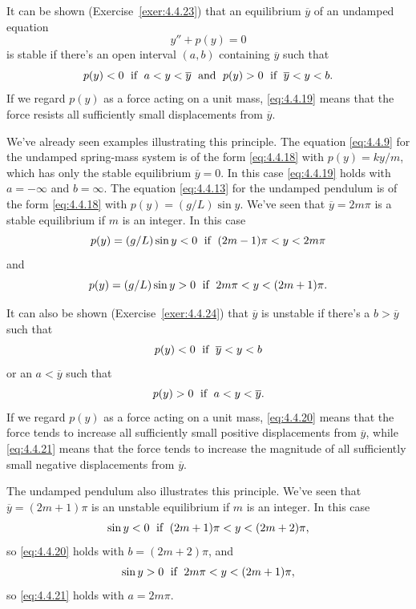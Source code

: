 
\noindent
It can be shown (Exercise~\ref{exer:4.4.23}) that an equilibrium $\overline{y}$ of an undamped
equation
\begin{equation}
  \label{eq:4.4.18}y''+p(y)=0
\end{equation}
is stable if there's an open interval $(a,b)$ containing $\overline{y}$ such that
\begin{equation}
  \label{eq:4.4.19}p(y)<0\mbox{\; if \;}a<y<\overline{y}\mbox{\; and \;}p(y)>0\mbox{\; if \;}\overline{y}<y<b.
\end{equation}
If we regard $p(y)$ as a force acting on a unit mass, \eqref{eq:4.4.19} means that the force resists
all sufficiently small displacements from $\overline{y}$.

We've already seen examples illustrating this principle. The equation \eqref{eq:4.4.9} for the
undamped spring-mass system is of the form \eqref{eq:4.4.18} with $p(y)=ky/m$, which has only the
stable equilibrium $\overline{y}=0$. In this case \eqref{eq:4.4.19} holds with $a=-\infty$ and
$b=\infty$. The equation \eqref{eq:4.4.13} for the undamped pendulum is of the form
\eqref{eq:4.4.18} with $p(y)=(g/L)\sin y$. We've seen that $\overline{y}=2m\pi$ is a stable
equilibrium if $m$ is an integer. In this case
\[
  p(y)=(g/L)\sin y<0 \mbox{\; if \;}(2m-1)\pi<y<2m\pi
\]
and
\[
  p(y)=(g/L)\sin y>0\mbox{\; if \;}2m\pi<y<(2m+1)\pi.
\]

It can also be shown (Exercise~\ref{exer:4.4.24}) that $\overline{y}$ is unstable if there's a
$b>\overline{y}$ such that
\begin{equation}
  \label{eq:4.4.20}p(y)<0\mbox{\; if \;}\overline{y}<y<b
\end{equation}
or an $a<\overline{y}$ such that
\begin{equation}
  \label{eq:4.4.21}p(y)>0\mbox{\; if \;}a<y<\overline{y}.
\end{equation}
If we regard $p(y)$ as a force acting on a unit mass, \eqref{eq:4.4.20} means that the force tends
to increase all sufficiently small positive displacements from $\overline{y}$, while
\eqref{eq:4.4.21} means that the force tends to increase the magnitude of all sufficiently small
negative displacements from $\overline{y}$.

The undamped pendulum also illustrates this principle. We've seen that $\overline{y}=(2m+1)\pi$ is
an unstable equilibrium if $m$ is an integer. In this case
\[
  \sin y<0\mbox{\; if \;}(2m+1)\pi<y<(2m+2)\pi,
\]
so \eqref{eq:4.4.20} holds with $b=(2m+2)\pi$, and
\[
  \sin y>0\mbox{\; if \;}2m\pi<y<(2m+1)\pi,
\]
so \eqref{eq:4.4.21} holds with $a=2m\pi$.

